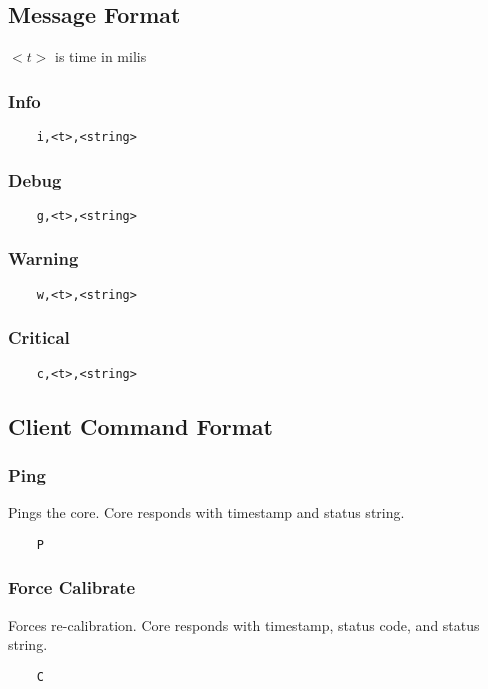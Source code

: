\documentclass[10pt]{article}
\begin{document}
\subsection{Message Format}
$<t>$ is time in milis
\subsubsection{Info}

\begin{lstlisting}
	i,<t>,<string>
\end{lstlisting}

\subsubsection{Debug}
\begin{lstlisting}
	g,<t>,<string>
\end{lstlisting}

\subsubsection{Warning}
\begin{lstlisting}
	w,<t>,<string>
\end{lstlisting}

\subsubsection{Critical}
\begin{lstlisting}
	c,<t>,<string>
\end{lstlisting}

\subsection{Client Command Format}

\subsubsection{Ping}
Pings the core. Core responds with timestamp and status string.
\begin{lstlisting}
	P
\end{lstlisting}

\subsubsection{Force Calibrate}
Forces re-calibration. Core responds with timestamp, status code, and status string.
\begin{lstlisting}
	C
\end{lstlisting}
\end{document}
